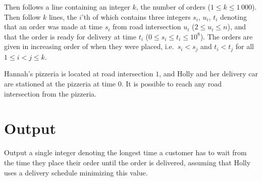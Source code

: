 Then follows a line containing an integer $k$, the number of orders ($1 \le k
\le 1\,000$). Then follow $k$ lines, the $i$'th of which contains three integers
$s_i$, $u_i$, $t_i$ denoting that an order was made at time $s_i$ from road
intersection $u_i$ ($2 \leq u_i \leq n$), and that the order is ready for
delivery at time $t_i$ ($0 \le s_i \le t_i \le 10^8$). The orders are given in
increasing order of when they were placed, i.e.\ $s_i < s_j$ and $t_i < t_j$
for all $1 \le i < j \le k$.

Hannah's pizzeria is located at road intersection $1$, and Holly and her delivery
car are stationed at the pizzeria at time $0$. It is possible to reach
any road intersection from the pizzeria.

\section*{Output}
Output a single integer denoting the longest time a customer has to wait from
the time they place their order until the order is delivered, assuming that Holly
uses a delivery schedule minimizing this value.
